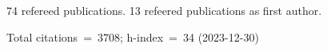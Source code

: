 74 refereed publications. 13 refeered publications as first author.

Total citations~=~3708; h-index~=~34 (2023-12-30)
